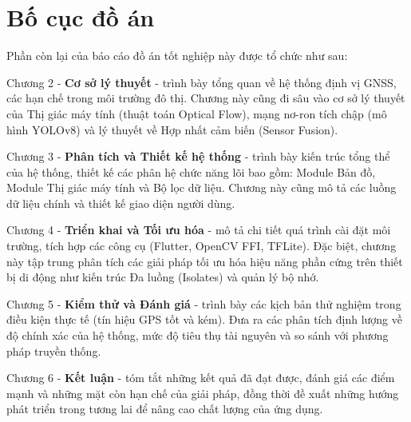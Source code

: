 \documentclass[../DoAn.tex]{subfiles}
\begin{document}
\section{Bố cục đồ án}
\label{section:1.4}

Phần còn lại của báo cáo đồ án tốt nghiệp này được tổ chức như sau:

Chương 2 - \textbf{Cơ sở lý thuyết} - trình bày tổng quan về hệ thống định vị GNSS, các hạn chế trong môi trường đô thị. Chương này cũng đi sâu vào cơ sở lý thuyết của Thị giác máy tính (thuật toán Optical Flow), mạng nơ-ron tích chập (mô hình YOLOv8) và lý thuyết về Hợp nhất cảm biến (Sensor Fusion).

Chương 3 - \textbf{Phân tích và Thiết kế hệ thống} - trình bày kiến trúc tổng thể của hệ thống, thiết kế các phân hệ chức năng lõi bao gồm: Module Bản đồ, Module Thị giác máy tính và Bộ lọc dữ liệu. Chương này cũng mô tả các luồng dữ liệu chính và thiết kế giao diện người dùng.

Chương 4 - \textbf{Triển khai và Tối ưu hóa} - mô tả chi tiết quá trình cài đặt môi trường, tích hợp các công cụ (Flutter, OpenCV FFI, TFLite). Đặc biệt, chương này tập trung phân tích các giải pháp tối ưu hóa hiệu năng phần cứng trên thiết bị di động như kiến trúc Đa luồng (Isolates) và quản lý bộ nhớ.

Chương 5 - \textbf{Kiểm thử và Đánh giá} - trình bày các kịch bản thử nghiệm trong điều kiện thực tế (tín hiệu GPS tốt và kém). Đưa ra các phân tích định lượng về độ chính xác của hệ thống, mức độ tiêu thụ tài nguyên và so sánh với phương pháp truyền thống.

Chương 6 - \textbf{Kết luận} - tóm tắt những kết quả đã đạt được, đánh giá các điểm mạnh và những mặt còn hạn chế của giải pháp, đồng thời đề xuất những hướng phát triển trong tương lai để nâng cao chất lượng của ứng dụng.
\end{document}
